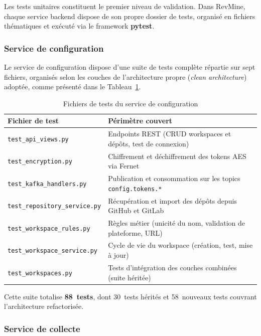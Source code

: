 Les tests unitaires constituent le premier niveau de validation. Dans RevMine, chaque service
backend dispose de son propre dossier de tests, organisé en fichiers thématiques et exécuté via
le framework \textbf{pytest}.

\subsubsection*{Service de configuration}

Le service de configuration dispose d'une suite de tests complète répartie sur sept fichiers,
organisés selon les couches de l'architecture propre (\textit{clean architecture}) adoptée,
comme présenté dans le Tableau~\ref{tab:tests-config}.

\begin{table}[H]
\centering
\small
\caption{Fichiers de tests du service de configuration}
\label{tab:tests-config}
\begin{tabular}{|>{\raggedright\arraybackslash}p{6cm}
                |>{\raggedright\arraybackslash}p{7cm}|}
\hline
\textbf{Fichier de test} & \textbf{Périmètre couvert} \\
\hline
\texttt{test\_api\_views.py} & Endpoints REST (CRUD workspaces et dépôts, test de connexion) \\
\hline
\texttt{test\_encryption.py} & Chiffrement et déchiffrement des tokens AES via Fernet \\
\hline
\texttt{test\_kafka\_handlers.py} & Publication et consommation sur les topics \texttt{config.tokens.*} \\
\hline
\texttt{test\_repository\_service.py} & Récupération et import des dépôts depuis GitHub et GitLab \\
\hline
\texttt{test\_workspace\_rules.py} & Règles métier (unicité du nom, validation de plateforme, URL) \\
\hline
\texttt{test\_workspace\_service.py} & Cycle de vie du workspace (création, test, mise à jour) \\
\hline
\texttt{test\_workspaces.py} & Tests d'intégration des couches combinées (suite héritée) \\
\hline
\end{tabular}
\end{table}

Cette suite totalise \textbf{88~tests}, dont 30~tests hérités et 58~nouveaux tests couvrant
l'architecture refactorisée.

\subsubsection*{Service de collecte}


